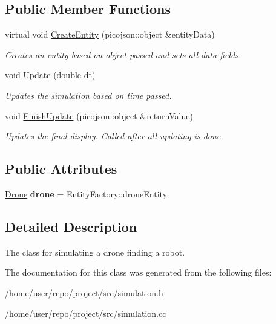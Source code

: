 \subsection*{Public Member Functions}
\begin{DoxyCompactItemize}
\item 
\mbox{\label{classSimulation_a3cd62ace1159d49c2120c2cf5d56e7ee}} 
virtual void \hyperlink{classSimulation_a3cd62ace1159d49c2120c2cf5d56e7ee}{Create\+Entity} (picojson\+::object \&entity\+Data)
\begin{DoxyCompactList}\small\item\em Creates an entity based on object passed and sets all data fields. \end{DoxyCompactList}\item 
\mbox{\label{classSimulation_a6f379a690fc567a53e74e954412467b0}} 
void \hyperlink{classSimulation_a6f379a690fc567a53e74e954412467b0}{Update} (double dt)
\begin{DoxyCompactList}\small\item\em Updates the simulation based on time passed. \end{DoxyCompactList}\item 
\mbox{\label{classSimulation_a073f3aa8c843e48b6b69148788d3fabf}} 
void \hyperlink{classSimulation_a073f3aa8c843e48b6b69148788d3fabf}{Finish\+Update} (picojson\+::object \&return\+Value)
\begin{DoxyCompactList}\small\item\em Updates the final display. Called after all updating is done. \end{DoxyCompactList}\end{DoxyCompactItemize}
\subsection*{Public Attributes}
\begin{DoxyCompactItemize}
\item 
\mbox{\label{classSimulation_a215d77c2edb2dbcdad76658b020d00e5}} 
\hyperlink{classDrone}{Drone} {\bfseries drone} = Entity\+Factory\+::drone\+Entity
\end{DoxyCompactItemize}


\subsection{Detailed Description}
The class for simulating a drone finding a robot. 

The documentation for this class was generated from the following files\+:\begin{DoxyCompactItemize}
\item 
/home/user/repo/project/src/simulation.\+h\item 
/home/user/repo/project/src/simulation.\+cc\end{DoxyCompactItemize}
